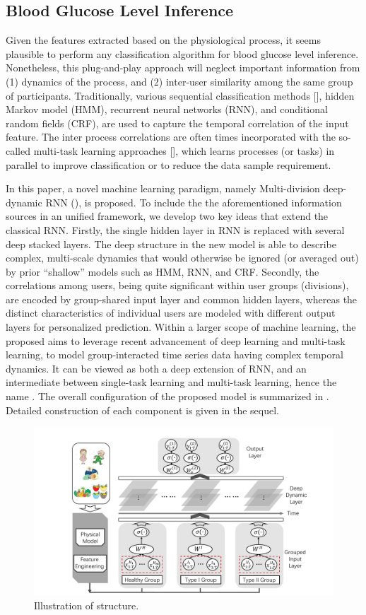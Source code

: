 \subsection{Blood Glucose Level Inference}
Given the features extracted based on the physiological process, it seems plausible to perform any classification algorithm for blood glucose level inference.
Nonetheless, this plug-and-play approach will neglect important information from (1) dynamics of the process, and (2) inter-user similarity among the same group of participants.
Traditionally, various sequential classification methods [], \eg hidden Markov model (HMM), recurrent neural networks (RNN), and conditional random fields (CRF), are used to capture the temporal correlation of the input feature.
The inter process correlations are often times incorporated with the so-called multi-task learning approaches [], which learns processes (or tasks) in parallel to improve classification or to reduce the data sample requirement.

In this paper, a novel machine learning paradigm, namely Multi-division deep-dynamic RNN (\modelname), is proposed.
To include the the aforementioned information sources in an unified framework, we develop two key ideas that extend the classical RNN. Firstly, the single hidden layer in RNN is replaced with several deep stacked layers.
The deep structure in the new model is able to describe complex, multi-scale dynamics that would otherwise be ignored (or averaged out) by prior ``shallow'' models such as HMM, RNN, and CRF.
Secondly, the correlations among users, being quite significant within user groups (divisions), are encoded by group-shared input layer and common hidden layers, whereas the distinct characteristics of individual users are modeled with different output layers for personalized prediction.
Within a larger scope of machine learning, the proposed \modelname aims to leverage recent advancement of deep learning and multi-task learning, to model group-interacted time series data having complex temporal dynamics.
It can be viewed as both a deep extension of RNN, and an intermediate between single-task learning and multi-task learning, hence the name \modelname.
The overall configuration of the proposed model is summarized in .
Detailed construction of each component is given in the sequel.

\begin{figure}[h]
  \centering
  \includegraphics[width=0.9\columnwidth]{./img/pics_RNN.pdf}
  \caption{Illustration of \modelname structure.}
  \label{fig:rnn}
\end{figure}

